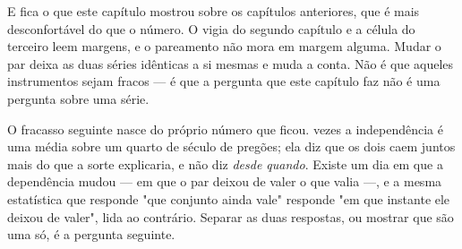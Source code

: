 E fica o que este capítulo mostrou sobre os capítulos anteriores, que é mais desconfortável do
que o número. O vigia do segundo capítulo e a célula do terceiro leem margens, e o pareamento não mora em margem alguma. Mudar o par deixa as duas séries idênticas a si mesmas e muda a conta. Não é que aqueles instrumentos sejam fracos --- é que a pergunta que este capítulo faz não
é uma pergunta sobre uma série.

O fracasso seguinte nasce do próprio número que ficou. \numDependenciaExcesso{} vezes a
independência é uma média sobre um quarto de século de pregões; ela diz que os dois caem juntos mais do que a
sorte explicaria, e não diz \emph{desde quando}. Existe um dia em que a dependência mudou --- em
que o par deixou de valer o que valia ---, e a mesma estatística que responde "que conjunto ainda
vale" responde "em que instante ele deixou de valer", lida ao contrário. Separar as duas
respostas, ou mostrar que são uma só, é a pergunta seguinte.
